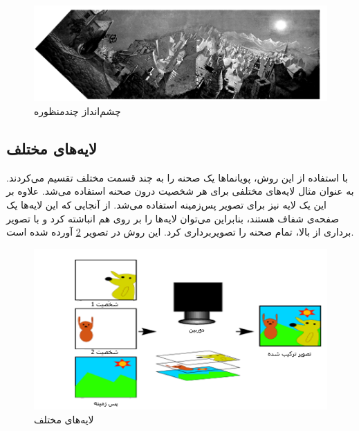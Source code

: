 \begin{figure}[ht]
	\centerline{\includegraphics[width=\textwidth,height=\textheight,keepaspectratio]{Figures/Ch1/Panorama.png}}

	\caption{چشم‌انداز چندمنظوره \cite{Wood1997Multiperspective}}
	\label{fig:Panorama}
\end{figure}


\subsection{لایه‌های مختلف}

با استفاده از این روش، پویانما‌ها یک صحنه را به چند قسمت مختلف تقسیم می‌کردند.
به عنوان مثال لایه‌های مختلفی برای هر شخصیت درون صحنه استفاده می‌شد. علاوه بر این یک لایه نیز برای تصویر پس‌زمینه استفاده می‌شد.
از آنجایی که این لایه‌ها یک صفحه‌ی شفاف هستند، بنابراین می‌توان لایه‌‌ها را 
بر روی هم انباشته کرد و با تصویر برداری از بالا، تمام صحنه را تصویربرداری کرد.
این روش در تصویر 
\ref{fig:DifferentLayers}
آورده شده است.

\begin{figure}[ht]
	\centerline{\includegraphics[width=\textwidth,height=\textheight,keepaspectratio]{Figures/Ch1/DifferentLayers.png}}

	\caption{لایه‌های مختلف\cite{AnimationCellsWikipedia}}
	\label{fig:DifferentLayers}
\end{figure}

